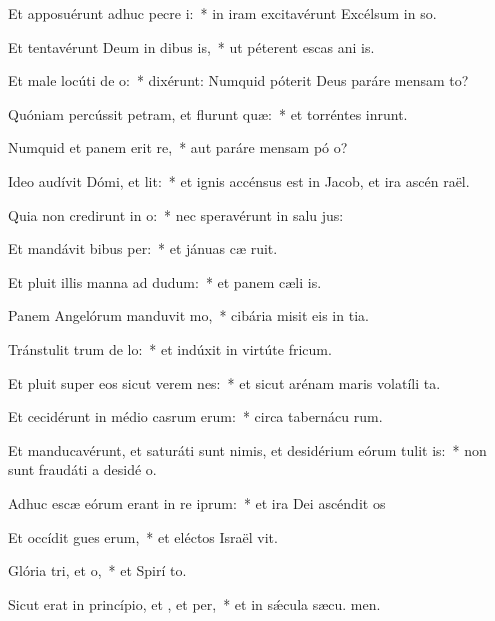 \item Et apposuérunt adhuc pecre i:~* in iram excitavérunt Excélsum in so.
\item Et tentavérunt Deum in dibus is,~* ut péterent escas ani is.
\item Et male locúti  de o:~* dixérunt: Numquid póterit Deus paráre mensam  to?
\item Quóniam percússit petram, et flurunt quæ:~* et torréntes inrunt.
\item Numquid et panem erit re,~* aut paráre mensam pó o?
\item Ideo audívit Dómi, et lit:~* et ignis accénsus est in Jacob, et ira ascén  raël.
\item Quia non credirunt in o:~* nec speravérunt in salu jus:
\item Et mandávit bibus per:~* et jánuas cæ ruit.
\item Et pluit illis manna ad dudum:~* et panem cæli  is.
\item Panem Angelórum manduvit mo,~* cibária misit eis in tia.
\item Tránstulit trum de lo:~* et indúxit in virtúte  fricum.
\item Et pluit super eos sicut verem nes:~* et sicut arénam maris volatíli ta.
\item Et cecidérunt in médio casrum erum:~* circa tabernácu rum.
\item Et manducavérunt, et saturáti sunt nimis, et desidérium eórum tulit is:~* non sunt fraudáti a desidé o.
\item Adhuc escæ eórum erant in re iprum:~* et ira Dei ascéndit  os
\item Et occídit gues erum,~* et eléctos Israël vit.
\item Glória tri, et o,~* et Spirí to.
\item Sicut erat in princípio, et , et per,~* et in sǽcula sæcu. men.
